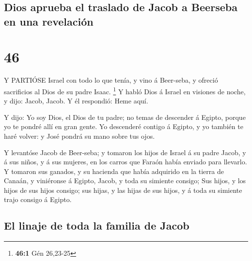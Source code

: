\hypertarget{dios-aprueba-el-traslado-de-jacob-a-beerseba-en-una-revelaciuxf3n}{%
\subsection{Dios aprueba el traslado de Jacob a Beerseba en una
revelación}\label{dios-aprueba-el-traslado-de-jacob-a-beerseba-en-una-revelaciuxf3n}}

\hypertarget{section-45}{%
\section{46}\label{section-45}}

 Y PARTIÓSE Israel con todo lo que tenía, y vino á
Beer-seba, y ofreció sacrificios al Dios de su padre Isaac. \footnote{\textbf{46:1}
  Gén 26,23-25}  Y habló Dios á Israel en visiones de noche,
y dijo: Jacob, Jacob. Y él respondió: Heme aquí.

 Y dijo: Yo soy Dios, el Dios de tu padre; no temas de
descender á Egipto, porque yo te pondré allí en gran gente. 
Yo descenderé contigo á Egipto, y yo también te haré volver: y José
pondrá su mano sobre tus ojos.

 Y levantóse Jacob de Beer-seba; y tomaron los hijos de
Israel á su padre Jacob, y á sus niños, y á sus mujeres, en los carros
que Faraón había enviado para llevarlo.  Y tomaron sus
ganados, y su hacienda que había adquirido en la tierra de Canaán, y
viniéronse á Egipto, Jacob, y toda su simiente consigo;  Sus
hijos, y los hijos de sus hijos consigo; sus hijas, y las hijas de sus
hijos, y á toda su simiente trajo consigo á Egipto.

\hypertarget{el-linaje-de-toda-la-familia-de-jacob}{%
\subsection{El linaje de toda la familia de
Jacob}\label{el-linaje-de-toda-la-familia-de-jacob}}


